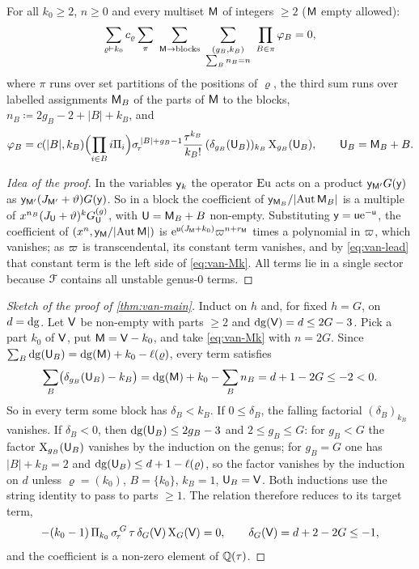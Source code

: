 \begin{thm}[{\Lg{Theorem~8.17}}]\label{thm:van-Mk}
For all $k_0\geq 2$, $n\geq 0$ and every multiset $\mathsf{M}$ of integers $\geq 2$ ($\mathsf{M}$ empty allowed):
\begin{equation}\label{eq:van-Mk}
\sum_{\varrho\vdash k_0}c_\varrho\sum_{\pi}\ \sum_{\msM\to\text{blocks}}\ \sum_{\substack{(g_B,k_B)\\\sum_Bn_B=n}}\ \prod_{B\in\pi}\varphi_B=0,
\end{equation}
where $\pi$ runs over set partitions of the positions of $\varrho$, the third sum runs over labelled assignments $\mathsf{M}_B$ of the parts of $\mathsf{M}$ to the blocks, $n_B\coloneqq2g_B-2+\lvert B\rvert+k_B$, and
\[
\varphi_B=c(\lvert B\rvert,k_B)\Bigl(\prod_{i\in B}i\Pi_i\Bigr)\sigma_{\!\tau}^{\,\lvert B\rvert+g_B-1}\frac{\tau^{k_B}}{k_B!}\,(\delta_{g_B}(\mathsf{U}_B))_{k_B}\,\mathrm{X}_{g_B}(\mathsf{U}_B),\qquad\mathsf{U}_B=\mathsf{M}_B+B.
\]
\end{thm}

\begin{proof}[Idea of the proof]
In the variables $\mathsf{y}_k$ the operator $\mathrm{Eu}$ acts on a product $\mathsf{y}_{\mathsf{M}'}G(\mathsf{y})$ as $\mathsf{y}_{\mathsf{M}'}(J_{\mathsf{M}'}+\vartheta)G(\mathsf{y})$. So in a block the coefficient of $\mathsf{y}_{\mathsf{M}_B}/\lvert\operatorname{Aut}\mathsf{M}_B\rvert$ is a multiple of $x^{n_B}(J_{\mathsf{U}}+\vartheta)^kG^{(g)}_{\mathsf{U}}$, with $\mathsf{U}=\mathsf{M}_B+B$ non-empty. Substituting $\mathsf{y}=\mathsf{u}\mathrm{e}^{-\mathsf{u}}$, the coefficient of $(x^n,\mathsf{y}_{\mathsf{M}}/\lvert\operatorname{Aut}\mathsf{M}\rvert)$ is $\mathrm{e}^{\mathsf{u}(J_{\mathsf{M}}+k_0)}\varpi^{n+r_{\mathsf{M}}}$ times a polynomial in $\varpi$, which vanishes; as $\varpi$ is transcendental, its constant term vanishes, and by \eqref{eq:van-lead} that constant term is the left side of \eqref{eq:van-Mk}. All terms lie in a single sector because $\mathcal{F}$ contains all unstable genus-$0$ terms.
\end{proof}

\begin{proof}[Sketch of the proof of \cref{thm:van-main}]
Induct on $h$ and, for fixed $h=G$, on $d=\mathrm{dg}$. Let $\mathsf{V}$ be non-empty with parts $\geq2$ and $\mathrm{dg}(\mathsf{V})=d\leq2G-3$. Pick a part $k_0$ of $\mathsf{V}$, put $\mathsf{M}=\mathsf{V}-k_0$, and take \eqref{eq:van-Mk} with $n=2G$. Since $\sum_B\mathrm{dg}(\mathsf{U}_B)=\mathrm{dg}(\mathsf{M})+k_0-\ell(\varrho)$, every term satisfies
\[
\sum_B\bigl(\delta_{g_B}(\mathsf{U}_B)-k_B\bigr)=\mathrm{dg}(\mathsf{M})+k_0-\sum_Bn_B=d+1-2G\leq-2<0.
\]
So in every term some block has $\delta_B<k_B$. If $0\leq\delta_B$, the falling factorial $(\delta_B)_{k_B}$ vanishes. If $\delta_B<0$, then $\mathrm{dg}(\mathsf{U}_B)\leq2g_B-3$ and $2\leq g_B\leq G$: for $g_B<G$ the factor $\mathrm{X}_{g_B}(\mathsf{U}_B)$ vanishes by the induction on the genus; for $g_B=G$ one has $\lvert B\rvert+k_B=2$ and $\mathrm{dg}(\mathsf{U}_B)\leq d+1-\ell(\varrho)$, so the factor vanishes by the induction on $d$ unless $\varrho=(k_0)$, $B=\{k_0\}$, $k_B=1$, $\mathsf{U}_B=\mathsf{V}$. Both inductions use the string identity to pass to parts $\geq1$. The relation therefore reduces to its target term,
\[
-(k_0-1)\,\Pi_{k_0}\,\sigma_{\!\tau}^{\,G}\,\tau\,\delta_G(\mathsf{V})\,\mathrm{X}_G(\mathsf{V})=0,\qquad\delta_G(\mathsf{V})=d+2-2G\leq-1,
\]
and the coefficient is a non-zero element of $\mathbb{Q}(\tau)$.
\end{proof}

